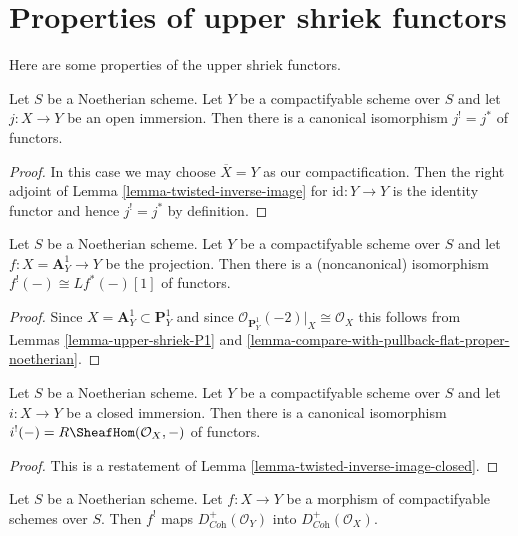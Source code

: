 \section{Properties of upper shriek functors}
\label{section-upper-shriek-properties}

\noindent
Here are some properties of the upper shriek functors.

\begin{lemma}
\label{lemma-shriek-open-immersion}
Let $S$ be a Noetherian scheme. Let $Y$ be a compactifyable
scheme over $S$ and let $j : X \to Y$ be an open immersion.
Then there is a canonical isomorphism $j^! = j^*$ of functors.
\end{lemma}

\begin{proof}
In this case we may choose $\overline{X} = Y$ as our compactification.
Then the
right adjoint of Lemma \ref{lemma-twisted-inverse-image} for
$\text{id} : Y \to Y$ is the
identity functor and hence $j^! = j^*$ by definition.
\end{proof}

\begin{lemma}
\label{lemma-shriek-affine-line}
Let $S$ be a Noetherian scheme. Let $Y$ be a compactifyable
scheme over $S$ and let $f : X = \mathbf{A}^1_Y \to Y$ be
the projection. Then there is a (noncanonical) isomorphism
$f^!(-) \cong Lf^*(-) [1]$ of functors.
\end{lemma}

\begin{proof}
Since $X = \mathbf{A}^1_Y \subset \mathbf{P}^1_Y$
and since $\mathcal{O}_{\mathbf{P}^1_Y}(-2)|_X \cong \mathcal{O}_X$
this follows from Lemmas \ref{lemma-upper-shriek-P1} and
\ref{lemma-compare-with-pullback-flat-proper-noetherian}.
\end{proof}

\begin{lemma}
\label{lemma-shriek-closed-immersion}
Let $S$ be a Noetherian scheme. Let $Y$ be a compactifyable
scheme over $S$ and let $i : X \to Y$ be a closed immersion.
Then there is a canonical isomorphism
$i^!(-) = R\SheafHom(\mathcal{O}_X, -)$ of functors.
\end{lemma}

\begin{proof}
This is a restatement of Lemma \ref{lemma-twisted-inverse-image-closed}.
\end{proof}

\begin{lemma}
\label{lemma-shriek-coherent}
Let $S$ be a Noetherian scheme. Let $f : X \to Y$ be a morphism
of compactifyable schemes over $S$. Then $f^!$ maps
$D_{\textit{Coh}}^+(\mathcal{O}_Y)$ into $D_{\textit{Coh}}^+(\mathcal{O}_X)$.
\end{lemma}

